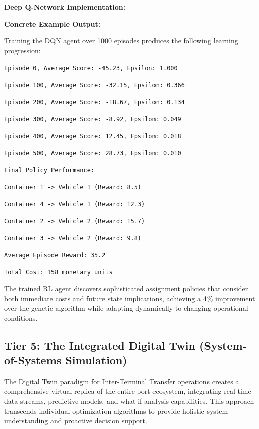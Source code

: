 \documentclass{article}
\begin{document}
\textbf{Deep Q-Network Implementation:}



\textbf{Concrete Example Output:}

Training the DQN agent over 1000 episodes produces the following learning progression:

\texttt{Episode 0, Average Score: -45.23, Epsilon: 1.000}

\texttt{Episode 100, Average Score: -32.15, Epsilon: 0.366}

\texttt{Episode 200, Average Score: -18.67, Epsilon: 0.134}

\texttt{Episode 300, Average Score: -8.92, Epsilon: 0.049}

\texttt{Episode 400, Average Score: 12.45, Epsilon: 0.018}

\texttt{Episode 500, Average Score: 28.73, Epsilon: 0.010}

\texttt{Final Policy Performance:}

\texttt{Container 1 -> Vehicle 1 (Reward: 8.5)}

\texttt{Container 4 -> Vehicle 1 (Reward: 12.3)}

\texttt{Container 2 -> Vehicle 2 (Reward: 15.7)}

\texttt{Container 3 -> Vehicle 2 (Reward: 9.8)}

\texttt{Average Episode Reward: 35.2}

\texttt{Total Cost: 158 monetary units}

The trained RL agent discovers sophisticated assignment policies that consider both immediate costs and future state implications, achieving a 4\% improvement over the genetic algorithm while adapting dynamically to changing operational conditions.

\subsection{Tier 5: The Integrated Digital Twin (System-of-Systems Simulation)}

The Digital Twin paradigm for Inter-Terminal Transfer operations creates a comprehensive virtual replica of the entire port ecosystem, integrating real-time data streams, predictive models, and what-if analysis capabilities. This approach transcends individual optimization algorithms to provide holistic system understanding and proactive decision support.
\end{document}
